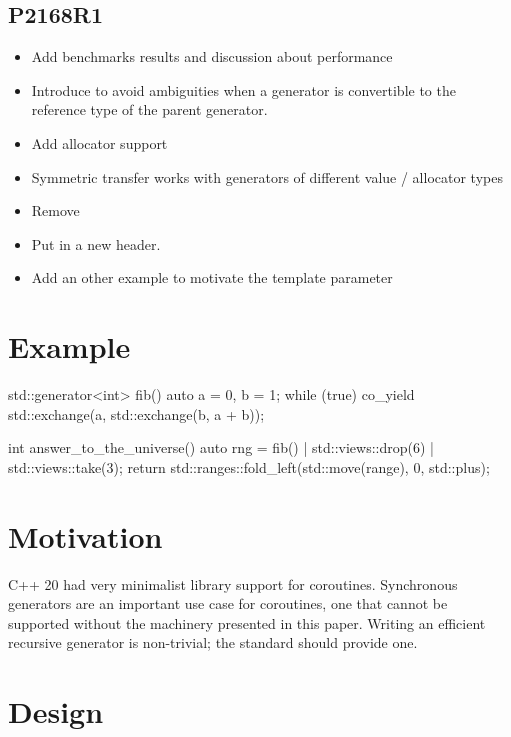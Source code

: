 \documentclass{wg21}
\begin{document}
\subsection{P2168R1}
\begin{itemize}
\item Add benchmarks results and discussion about performance
\item Introduce  to avoid ambiguities when a generator is convertible to the reference type of the parent generator.
\item Add allocator support
\item Symmetric transfer works with generators of different value / allocator types
\item Remove 
\item Put  in a new  header.
\item Add an other example to motivate the  template parameter
\end{itemize}


\section{Example}

\begin{colorblock}
    std::generator<int> fib() {
        auto a = 0, b = 1;
        while (true) {
            co_yield std::exchange(a, std::exchange(b, a + b));
        }
    }

    int answer_to_the_universe() {
        auto rng = fib() | std::views::drop(6) | std::views::take(3);
        return std::ranges::fold_left(std::move(range), 0, std::plus{});
    }
\end{colorblock}


\section{Motivation}

C++ 20 had very minimalist library support for coroutines.
Synchronous generators are an important use case for coroutines,
one that cannot be supported
without the machinery presented in this paper.
Writing an efficient recursive generator is non-trivial;
the standard should provide one.


\section{Design}
\end{document}
